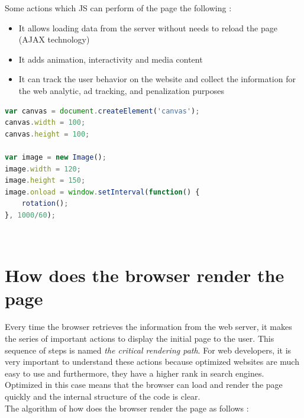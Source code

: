Some actions which JS can perform of the page the following \cite{JS}:

\begin{itemize}
    \item It allows loading data from the server without needs to reload the page (AJAX technology)
    \item It adds animation, interactivity and media content
    \item It can track the user behavior on the website and collect the information for the web analytic, ad tracking, and penalization purposes
\end{itemize}

\begin{lstlisting}[language=JavaScript, caption={A small example of JavaScript code}, label={lst:js}, captionpos=b]
var canvas = document.createElement('canvas');
canvas.width = 100;
canvas.height = 100;

var image = new Image();
image.width = 120;
image.height = 150;
image.onload = window.setInterval(function() {
    rotation();
}, 1000/60);
\end{lstlisting}\\


\section{How does the browser render the page}
\label{sec:browser}

Every time the browser retrieves the information from the web server, it makes the series of important actions to display the initial page to the user. This sequence of steps is named \textit{the critical rendering path}. For web developers, it is very important to understand these actions because optimized websites are much easy to use and furthermore, they have a higher rank in search engines. Optimized in this case means that the browser can load and render the page quickly and the internal structure of the code is clear.\\

The algorithm of how does the browser render the page as follows \cite{GoogleDev}:

